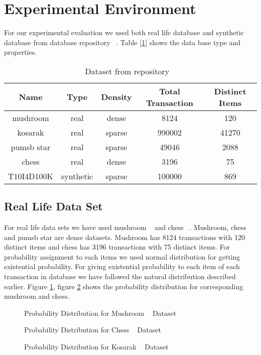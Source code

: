 \section{Experimental Environment}
For our experimental evaluation we used both real life database and synthetic database from database repository ~\cite{dataset}. Table [\ref{table:dataset}] shows the data base type and properties.
		\begin{table}[h]
		\centering
		\begin{tabular}{|c|c|c|c|c|}
		\hline 
		Name		&	Type	&	Density	&	Total Transaction 	&	Distinct Items	\\ \hline \hline
		mushroom	&	real	&	dense	&	8124	&	120							\\ \hline
		kosarak		&	real	&	sparse	&	990002	&	41270						\\ \hline
		pumsb star	&	real	&	sparse	&	49046	&	2088						\\ \hline
		chess		&	real	&	dense	&	3196	&	75							\\ \hline
		T10I4D100K	&	synthetic	&	sparse	&	100000	&	869						\\ \hline
			\end{tabular}
		\caption{Dataset from repository ~\cite{dataset}}
		\label{table:dataset}
		\end{table}


\subsection{Real Life Data Set}
For real life data sets we have used mushroom ~\cite{dataset} and chess ~\cite{dataset}. Mushroom, chess and pumsb star are dense datasets. Mushroom has 8124 transactions with 120 distinct items and chess has 3196 transactions with 75 distinct items. For probability assignment to each items we used normal distribution for getting existential probability. For giving existential probability to each item of each transaction in database we have followed the natural distribution described earlier. Figure \ref{result:g_dataset_mushroom}, figure \ref{result:g_dataset_chess} shows the probability distribution for corresponding mushroom and chess.
		\begin{figure}[h]
		\centering
			
		\caption{Probability Distribution for Mushroom ~\cite{dataset} Dataset}
		\label{result:g_dataset_mushroom}
		\end{figure}
		
		\begin{figure}[h]
		\centering
			
		\caption{Probability Distribution for Chess ~\cite{dataset} Dataset}
		\label{result:g_dataset_chess}
		\end{figure}
		\begin{figure}[h]
		\centering
			
		\caption{Probability Distribution for Kosarak ~\cite{dataset} Dataset}
		\label{result:g_dataset_kosarak}
		\end{figure}



